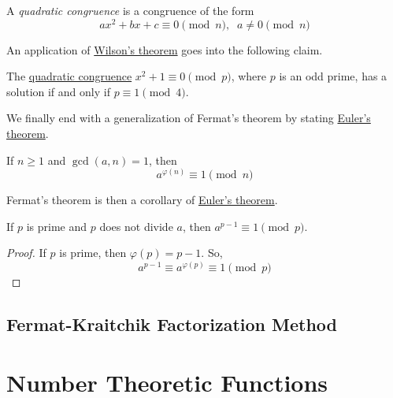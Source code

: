 \documentclass{article}
\newcounter{theorem}[section]
\newcounter{definition}[section]
\begin{document}
\begin{definition}
  \label{def:quadratic-congruence}
A \textit{quadratic congruence} is a congruence of the form 
\begin{equation}
  a x^2 + bx + c \equiv 0 \pmod{n}, \;\; a \neq 0 \pmod{n}
\end{equation}
\end{definition}

An application of \hyperref[thm:wilsons-theorem]{Wilson's theorem} goes into the following claim. 

\begin{theorem}
  \label{thm:solvability-of-x21equiv0pmodp}
The \hyperref[def:quadratic-congruence]{quadratic congruence} $x^2 + 1 \equiv 0 \pmod{p}$, where $p$ is an odd prime, has a solution if and only if $p \equiv 1 \pmod{4}$. 
\end{theorem}

We finally end with a generalization of Fermat's theorem by stating \hyperref[alg-thm:eulers-theorem]{Euler's theorem}. 

\begin{theorem}
  \label{thm:eulers-theorem}
If $n \geq 1$ and $\gcd(a, n) = 1$, then 
\begin{equation}
  a^{\varphi(n)} \equiv 1 \pmod{n}
\end{equation}
\end{theorem}

Fermat's theorem is then a corollary of \hyperref[thm:eulers-theorem]{Euler's theorem}. 

\begin{corollary}
  \label{thm:fermats-little-theorem-2}
If $p$ is prime and $p$ does not divide $a$, then $a^{p-1} \equiv 1 \pmod{p}$. 
\end{corollary}
\begin{proof}
If $p$ is prime, then $\varphi(p) = p-1$. So, 
\begin{equation}
  a^{p-1} \equiv a^{\varphi(p)} \equiv 1 \pmod{p}
\end{equation}
\end{proof}

\subsection{Fermat-Kraitchik Factorization Method}


\section{Number Theoretic Functions}
\end{document}
